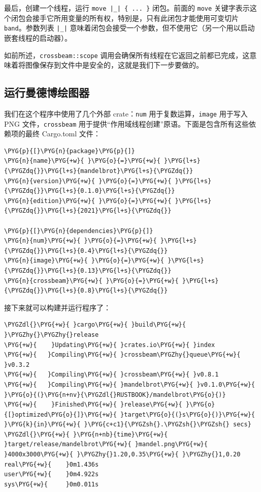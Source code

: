 最后，创建一个线程，运行 \texttt{move |\_| \{ ... \}} 闭包。前面的 \texttt{move} 关键字表示这个闭包会接手它所用变量的所有权，特别是，只有此闭包才能使用可变切片 \texttt{band}。参数列表 \texttt{|\_|} 意味着闭包会接受一个参数，但不使用它（另一个用以启动嵌套线程的启动器）。

如前所述，\texttt{crossbeam::scope} 调用会确保所有线程在它返回之前都已完成，这意味着将图像保存到文件中是安全的，这就是我们下一步要做的。

\subsection{运行曼德博绘图器}

我们在这个程序中使用了几个外部 crate：\texttt{num} 用于复数运算，\texttt{image} 用于写入 PNG 文件，\texttt{crossbeam} 用于提供“作用域线程创建”原语。下面是包含所有这些依赖项的最终 Cargo.toml 文件：

\begin{Verbatim}[commandchars=\\\{\},breaklines=true,breakanywhere=true,fontsize=\codefont,xleftmargin=17bp]
\PYG{p}{[}\PYG{n}{package}\PYG{p}{]}
\PYG{n}{name}\PYG{+w}{ }\PYG{o}{=}\PYG{+w}{ }\PYG{l+s}{\PYGZdq{}}\PYG{l+s}{mandelbrot}\PYG{l+s}{\PYGZdq{}}
\PYG{n}{version}\PYG{+w}{ }\PYG{o}{=}\PYG{+w}{ }\PYG{l+s}{\PYGZdq{}}\PYG{l+s}{0.1.0}\PYG{l+s}{\PYGZdq{}}
\PYG{n}{edition}\PYG{+w}{ }\PYG{o}{=}\PYG{+w}{ }\PYG{l+s}{\PYGZdq{}}\PYG{l+s}{2021}\PYG{l+s}{\PYGZdq{}}

\PYG{p}{[}\PYG{n}{dependencies}\PYG{p}{]}
\PYG{n}{num}\PYG{+w}{ }\PYG{o}{=}\PYG{+w}{ }\PYG{l+s}{\PYGZdq{}}\PYG{l+s}{0.4}\PYG{l+s}{\PYGZdq{}}
\PYG{n}{image}\PYG{+w}{ }\PYG{o}{=}\PYG{+w}{ }\PYG{l+s}{\PYGZdq{}}\PYG{l+s}{0.13}\PYG{l+s}{\PYGZdq{}}
\PYG{n}{crossbeam}\PYG{+w}{ }\PYG{o}{=}\PYG{+w}{ }\PYG{l+s}{\PYGZdq{}}\PYG{l+s}{0.8}\PYG{l+s}{\PYGZdq{}}
\end{Verbatim}

接下来就可以构建并运行程序了：

\begin{Verbatim}[commandchars=\\\{\},breaklines=true,breakanywhere=true,fontsize=\codefont,xleftmargin=17bp]
\PYGZdl{}\PYG{+w}{ }cargo\PYG{+w}{ }build\PYG{+w}{ }\PYGZhy{}\PYGZhy{}release
\PYG{+w}{    }Updating\PYG{+w}{ }crates.io\PYG{+w}{ }index
\PYG{+w}{   }Compiling\PYG{+w}{ }crossbeam\PYGZhy{}queue\PYG{+w}{ }v0.3.2
\PYG{+w}{   }Compiling\PYG{+w}{ }crossbeam\PYG{+w}{ }v0.8.1
\PYG{+w}{   }Compiling\PYG{+w}{ }mandelbrot\PYG{+w}{ }v0.1.0\PYG{+w}{ }\PYG{o}{(}\PYG{n+nv}{\PYGZdl{}RUSTBOOK}/mandelbrot\PYG{o}{)}
\PYG{+w}{    }Finished\PYG{+w}{ }release\PYG{+w}{ }\PYG{o}{[}optimized\PYG{o}{]}\PYG{+w}{ }target\PYG{o}{(}s\PYG{o}{)}\PYG{+w}{ }\PYG{k}{in}\PYG{+w}{ }\PYG{c+c1}{\PYGZsh{}.\PYGZsh{}\PYGZsh{} secs}
\PYGZdl{}\PYG{+w}{ }\PYG{n+nb}{time}\PYG{+w}{ }target/release/mandelbrot\PYG{+w}{ }mandel.png\PYG{+w}{ }4000x3000\PYG{+w}{ }\PYGZhy{}1.20,0.35\PYG{+w}{ }\PYGZhy{}1,0.20
real\PYG{+w}{    }0m1.436s
user\PYG{+w}{    }0m4.922s
sys\PYG{+w}{     }0m0.011s
\end{Verbatim}

